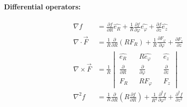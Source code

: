 \documentclass[11pt]{article}
\begin{document}
                    \paragraph{Differential operators:}
                    \begin{subequations}
                        \begin{align}
                            \nabla f  &= \frac{\partial f}{\partial R} \hat{e_R} + \frac{1}{R}\frac{\partial f}{\partial \varphi} \hat{e_{\varphi}}
                            + \frac{\partial f}{\partial z} \hat{e_z}\\
                             \nabla \cdot \vec{F} &= \frac{1}{R}\frac{\partial}{\partial R}(RF_R)
                            + \frac{1}{R}\frac{\partial F_{\varphi}}{\partial \varphi} + \frac{\partial F_z}{\partial z}\\
                             \nabla \times \vec{F} &= \frac{1}{R}
                            \begin{vmatrix}
                                \hat{e_R} && R \hat{e_\varphi} && \hat{e_z} \\
                                \frac{\partial}{\partial R} && \frac{\partial}{\partial \varphi} && \frac{\partial}{\partial z} \\
                                F_R && R F_{\varphi} && F_z
                            \end{vmatrix}\\
                            \nabla^2 f &= \frac{1}{R}\frac{\partial}{\partial R}\left(
                            R \frac{\partial f}{\partial R}\right) + \frac{1}{R^2}\frac{\partial^2 f}{\partial \varphi^2}
                            + \frac{\partial^2 f}{\partial z^2}
                        \end{align}
                    \end{subequations}
\end{document}
